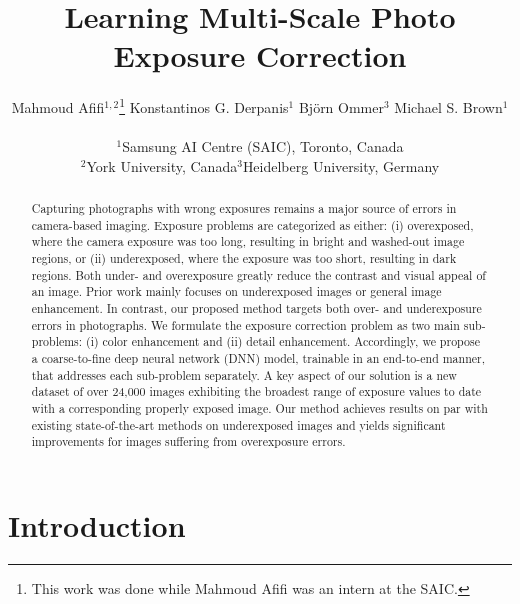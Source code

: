 \documentclass[final]{cvpr}
\begin{document}
\title{Learning Multi-Scale Photo Exposure Correction}

\author{Mahmoud Afifi$^{1,2}$\thanks{This work was done while Mahmoud Afifi was an intern at the SAIC.} \hspace{5mm} Konstantinos G. Derpanis$^{1}$ \hspace{5mm} Bj{\"o}rn Ommer$^{3}$ \hspace{5mm} Michael S. Brown$^{1}$\\\\
$^{1}$Samsung AI Centre (SAIC), Toronto, Canada\\$^{2}$York University, Canada\hspace{0.4cm}$^{3}$Heidelberg University, Germany}



\maketitle


\begin{abstract}
Capturing photographs with wrong exposures remains a major source of errors in camera-based imaging. Exposure problems are categorized as either: (i) overexposed, where the camera exposure was too long, resulting in bright and washed-out image regions, or (ii) underexposed, where the exposure was too short, resulting in dark regions. Both under- and overexposure greatly reduce the contrast and visual appeal of an image. Prior work mainly focuses on underexposed images or general image enhancement. In contrast, our proposed method targets both over- and underexposure errors in photographs. We formulate the exposure correction problem as two main sub-problems: (i) color enhancement and (ii) detail enhancement. Accordingly, we propose a coarse-to-fine deep neural network (DNN) model, trainable in an end-to-end manner, that addresses each sub-problem separately. A key aspect of our solution is a new dataset of over 24,000 images exhibiting the broadest range of exposure values to date with a corresponding properly exposed image. Our method achieves results on par with existing state-of-the-art methods on underexposed images and yields significant improvements for images suffering from overexposure errors.
\end{abstract}

\section{Introduction}
\label{sec:intro}
\end{document}
